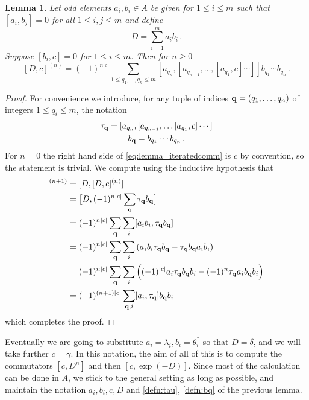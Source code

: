 \documentclass[english,letter paper,12pt,leqno]{article}
\newtheorem{lemma}[theorem]{Lemma}
\theoremstyle{example}
\numberwithin{equation}{section}
\def\be{\begin{equation}}
\def\ee{\end{equation}}
\begin{document}
\begin{lemma}\label{lemma_iteratedcomm} Let odd elements $a_i, b_i \in A$ be given for $1 \le i \le m$ such that $[a_i, b_j] = 0$ for all $1 \le i,j \le m$ and define
\[
D = \sum_{i=1}^m a_i b_i\,.
\]
Suppose $[b_i,c] = 0$ for $1 \le i \le m$. Then for $n \ge 0$
\be\label{eq:lemma_iteratedcomm}
[D, c]^{(n)} = (-1)^{n|c|} \sum_{1 \le q_1,\ldots,q_n \le m} [a_{q_n}, [a_{q_{n-1}}, \ldots, [ a_{q_1}, c] \cdots ]] b_{q_1} \cdots b_{q_n}\,.
\ee
\end{lemma}
\begin{proof}
For convenience we introduce, for any tuple of indices $\bold{q} = (q_1,\ldots,q_n)$ of integers $1 \le q_i \le m$, the notation
\begin{gather}
\tau_{\bold{q}} = [ a_{q_n}, [ a_{q_{n-1}}, \ldots [ a_{q_1}, c ] \cdots ] \label{defn:tau}\\
b_{\bold{q}} = b_{q_1} \cdots b_{q_n} \label{defn:bq}\,.
\end{gather}
For $n = 0$ the right hand side of \eqref{eq:lemma_iteratedcomm} is $c$ by convention, so the statement is trivial. We compute using the inductive hypothesis that
\begin{align*}
[D, c]^{(n+1)} &= [ D, [D, c]^{(n)} ]\\
&= \big[D, (-1)^{n|c|} \sum_{\bold{q}} \tau_{\bold{q}} b_{\bold{q}}\big]\\
&= (-1)^{n|c|} \sum_{\bold{q}} \sum_i [ a_i b_i , \tau_{\bold{q}} b_{\bold{q}}]\\
&= (-1)^{n|c|} \sum_{\bold{q}} \sum_i \left( a_i b_i \tau_{\bold{q}} b_{\bold{q}} - \tau_{\bold{q}} b_{\bold{q}} a_i b_i \right)\\
&= (-1)^{n|c|} \sum_{\bold{q}} \sum_i \left( (-1)^{|c|} a_i \tau_{\bold{q}} b_{\bold{q}} b_i - (-1)^n \tau_{\bold{q}} a_i b_{\bold{q}} b_i \right)\\
&= (-1)^{(n+1)|c|} \sum_{\bold{q}, i} [ a_i, \tau_{\bold{q}} ] b_{\bold{q}} b_i
\end{align*}
which completes the proof.
\end{proof}

Eventually we are going to substitute $a_i = \lambda_i, b_i = \theta_i^*$ so that $D = \delta$, and we will take further $c = \gamma$. In this notation, the aim of all of this is to compute the commutators $[c, D^n]$ and then $[c, \exp(-D)]$. Since most of the calculation can be done in $A$, we stick to the general setting as long as possible, and maintain the notation $a_i, b_i, c, D$ and \eqref{defn:tau}, \eqref{defn:bq} of the previous lemma.
\end{document}
